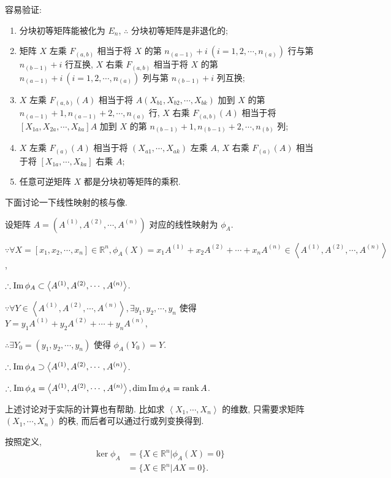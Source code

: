 \documentclass{ctexart}
\begin{document}
容易验证:
\begin{theorem}
    \begin{enumerate}
        \def\labelenumi{(\arabic{enumi})}
        \item 分块初等矩阵能被化为 $E_n$, $\therefore$ 分块初等矩阵是非退化的;
        \item 矩阵 $X$ 左乘 $F_{(a,b)}$ 相当于将 $X$ 的第 $n_{(a-1)}+i\ (i=1,2,\cdots,n_{(a)})$ 行与第 $n_{(b-1)}+i$ 行互换, $X$ 右乘 $F_{(a,b)}$ 相当于将 $X$ 的第 $n_{(a-1)}+i\ (i=1,2,\cdots,n_{(a)})$ 列与第 $n_{(b-1)}+i$ 列互换;
        \item $X$ 左乘 $F_{(a,b)}(A)$ 相当于将 $A(X_{b1},X_{b2},\cdots,X_{bk})$ 加到 $X$ 的第 $n_{(a-1)}+1,n_{(a-1)}+2,\cdots,n_{(a)}$ 行, $X$ 右乘 $F_{(a,b)}(A)$ 相当于将 $[X_{1a},X_{2a},\cdots,X_{ka}]A$ 加到 $X$ 的第 $n_{(b-1)}+1,n_{(b-1)}+2,\cdots,n_{(b)}$ 列;
        \item $X$ 左乘 $F_{(a)}(A)$ 相当于将 $(X_{a1},\cdots,X_{ak})$ 左乘 $A$, $X$ 右乘 $F_{(a)}(A)$ 相当于将 $[X_{1a},\cdots,X_{ka}]$ 右乘 $A$;
        \item 任意可逆矩阵 $X$ 都是分块初等矩阵的乘积.
    \end{enumerate}
\end{theorem}

下面讨论一下线性映射的核与像.

设矩阵 $A=(A^{(1)},A^{(2)},\cdots,A^{(n)})$ 对应的线性映射为 $\phi_A$.

$\because\forall X=[x_1,x_2,\cdots,x_n]\in\mathbb{R}^n,\phi_A(X)=x_1A^{(1)}+x_2A^{(2)}+\cdots+x_nA^{(n)}\in\left<A^{(1)},A^{(2)},\cdots,A^{(n)}\right>$,

$\therefore\operatorname{Im} \phi_A\subset\left<A^{(1)},A^{(2)},\cdots,A^{(n)}\right>$.

$\because\forall Y\in\left<A^{(1)},A^{(2)},\cdots,A^{(n)}\right>,\exists y_1,y_2,\cdots,y_n$ 使得 $Y=y_1A^{(1)}+y_2A^{(2)}+\cdots+y_nA^{(n)}$,

$\therefore\exists Y_0=(y_1,y_2,\cdots,y_n)$ 使得 $\phi_A(Y_0)=Y$.

$\therefore\operatorname{Im} \phi_A\supset\left<A^{(1)},A^{(2)},\cdots,A^{(n)}\right>$.

$\therefore\operatorname{Im} \phi_A=\left<A^{(1)},A^{(2)},\cdots,A^{(n)}\right>,\dim\operatorname{Im} \phi_A=\operatorname{rank} A$.

上述讨论对于实际的计算也有帮助. 比如求 $\left<X_1,\cdots,X_n\right>$ 的维数, 只需要求矩阵 $(X_1,\cdots,X_n)$ 的秩, 而后者可以通过行或列变换得到.

按照定义,
\begin{align*}
    \ker\phi_A & =\{X\in\mathbb{R}^n|\phi_A(X)=0\} \\
    & =\{X\in\mathbb{R}^n|AX=0\}.
\end{align*}
\end{document}

